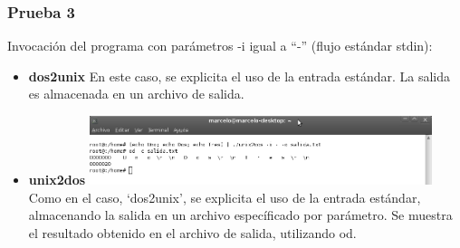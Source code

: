 \documentclass[a4paper,10pt]{article}
\begin{document}
    \subsubsection{Prueba 3}
    Invocaci\'on del programa con par\'ametros -i igual a ``-'' (flujo est\'andar stdin):
      \begin{itemize}
      \item \textbf{dos2unix}
      \newline 
      En este caso, se explicita el uso de la entrada est\'andar. La salida es almacenada en un archivo
      de salida. 
      \item \textbf{unix2dos}
      \newline 
      \includegraphics[width=10cm, viewport=0 0 897 181]{../Informe/Imagenes/prueba3-invocacion-unix2dos.png}	
      \newline
      Como en el caso, `dos2unix', se explicita el uso de la entrada est\'andar, almacenando la salida en un archivo espec\'ificado por par\'ametro.
      Se muestra el resultado obtenido en el archivo de salida, utilizando od.
      
    \end{itemize}
\end{document}
